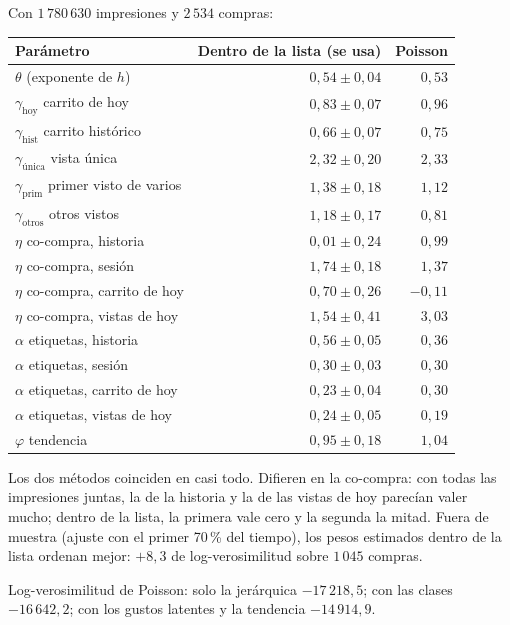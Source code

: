 \documentclass[11pt,a4paper]{article}
\begin{document}
Con $1\,780\,630$ impresiones y $2\,534$ compras:

\begin{center}
\small
\begin{tabular}{lrr}
\toprule
Parámetro & Dentro de la lista (se usa) & Poisson\\
\midrule
$\theta$ (exponente de $h$) & $0{,}54\pm0{,}04$ & $0{,}53$\\
$\gamma_{\text{hoy}}$ carrito de hoy & $0{,}83\pm0{,}07$ & $0{,}96$\\
$\gamma_{\text{hist}}$ carrito histórico & $0{,}66\pm0{,}07$ & $0{,}75$\\
$\gamma_{\text{única}}$ vista única & $2{,}32\pm0{,}20$ & $2{,}33$\\
$\gamma_{\text{prim}}$ primer visto de varios & $1{,}38\pm0{,}18$ & $1{,}12$\\
$\gamma_{\text{otros}}$ otros vistos & $1{,}18\pm0{,}17$ & $0{,}81$\\
$\eta$ co-compra, historia & $0{,}01\pm0{,}24$ & $0{,}99$\\
$\eta$ co-compra, sesión & $1{,}74\pm0{,}18$ & $1{,}37$\\
$\eta$ co-compra, carrito de hoy & $0{,}70\pm0{,}26$ & $-0{,}11$\\
$\eta$ co-compra, vistas de hoy & $1{,}54\pm0{,}41$ & $3{,}03$\\
$\alpha$ etiquetas, historia & $0{,}56\pm0{,}05$ & $0{,}36$\\
$\alpha$ etiquetas, sesión & $0{,}30\pm0{,}03$ & $0{,}30$\\
$\alpha$ etiquetas, carrito de hoy & $0{,}23\pm0{,}04$ & $0{,}30$\\
$\alpha$ etiquetas, vistas de hoy & $0{,}24\pm0{,}05$ & $0{,}19$\\
$\varphi$ tendencia & $0{,}95\pm0{,}18$ & $1{,}04$\\
\bottomrule
\end{tabular}
\end{center}

Los dos métodos coinciden en casi todo. Difieren en la co-compra: con todas las impresiones juntas, la de
la historia y la de las vistas de hoy parecían valer mucho; dentro de la lista, la primera vale cero y la
segunda la mitad. Fuera de muestra (ajuste con el primer 70\,\% del tiempo), los pesos estimados dentro
de la lista ordenan mejor: $+8{,}3$ de log-verosimilitud sobre $1\,045$ compras.

Log-verosimilitud de Poisson: solo la jerárquica $-17\,218{,}5$; con las clases $-16\,642{,}2$; con los
gustos latentes y la tendencia $-14\,914{,}9$.
\end{document}
